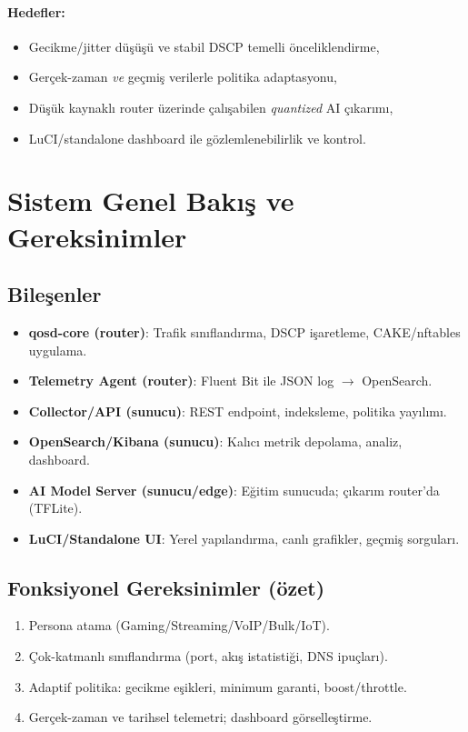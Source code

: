 \documentclass[11pt,a4paper]{article}
\begin{document}
\paragraph{Hedefler:}
\begin{itemize}
  \item Gecikme/jitter düşüşü ve stabil DSCP temelli önceliklendirme,
  \item Gerçek-zaman \emph{ve} geçmiş verilerle politika adaptasyonu,
  \item Düşük kaynaklı router üzerinde çalışabilen \emph{quantized} AI çıkarımı,
  \item LuCI/standalone dashboard ile gözlemlenebilirlik ve kontrol.
\end{itemize}

\section{Sistem Genel Bakış ve Gereksinimler}
\subsection{Bileşenler}
\begin{itemize}
  \item \textbf{qosd-core (router)}: Trafik sınıflandırma, DSCP işaretleme, CAKE/nftables uygulama.
  \item \textbf{Telemetry Agent (router)}: Fluent Bit ile JSON log $\rightarrow$ OpenSearch.
  \item \textbf{Collector/API (sunucu)}: REST endpoint, indeksleme, politika yayılımı.
  \item \textbf{OpenSearch/Kibana (sunucu)}: Kalıcı metrik depolama, analiz, dashboard.
  \item \textbf{AI Model Server (sunucu/edge)}: Eğitim sunucuda; çıkarım router’da (TFLite).
  \item \textbf{LuCI/Standalone UI}: Yerel yapılandırma, canlı grafikler, geçmiş sorguları.
\end{itemize}

\subsection{Fonksiyonel Gereksinimler (özet)}
\begin{enumerate}[label=FR\arabic*:]
  \item Persona atama (Gaming/Streaming/VoIP/Bulk/IoT).
  \item Çok-katmanlı sınıflandırma (port, akış istatistiği, DNS ipuçları).
  \item Adaptif politika: gecikme eşikleri, minimum garanti, boost/throttle.
  \item Gerçek-zaman ve tarihsel telemetri; dashboard görselleştirme.
\end{enumerate}
\end{document}
